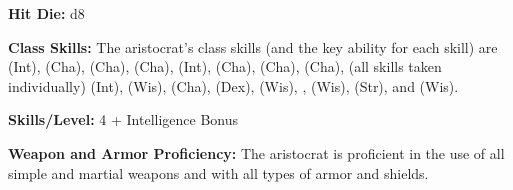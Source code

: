
\textbf{Hit Die:} d8

\textbf{Class Skills:} The aristocrat's class skills (and the key ability for each skill) are  (Int),  (Cha),  (Cha),  (Cha),  (Int),  (Cha),  (Cha),  (Cha),  (all skills taken individually) (Int),  (Wis),  (Cha),  (Dex),  (Wis), ,  (Wis),  (Str), and  (Wis).

\textbf{Skills/Level:} 4 + Intelligence Bonus

\modebab
\poorfor
\poorref
\goodwil

\begin{classtable}
\levelone{--}
\leveltwo{--}
\levelthree{--}
\levelfour{--}
\levelfive{--}
\end{classtable}

\classfeatures

\textbf{Weapon and Armor Proficiency:} The aristocrat is proficient in the use of all simple and martial weapons and with all types of armor and shields.
